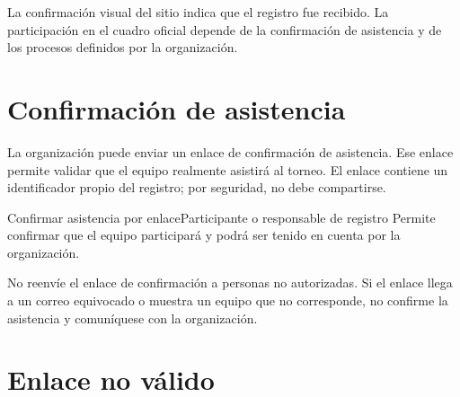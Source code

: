 \begin{nota}
La confirmación visual del sitio indica que el registro fue recibido. La participación en el cuadro oficial depende de la confirmación de asistencia y de los procesos definidos por la organización.
\end{nota}

\section{Confirmación de asistencia}

La organización puede enviar un enlace de confirmación de asistencia. Ese enlace permite validar que el equipo realmente asistirá al torneo. El enlace contiene un identificador propio del registro; por seguridad, no debe compartirse.

\begin{procedimiento}{Confirmar asistencia por enlace}{Participante o responsable de registro}
Permite confirmar que el equipo participará y podrá ser tenido en cuenta por la organización.
\end{procedimiento}




\begin{advertencia}
No reenvíe el enlace de confirmación a personas no autorizadas. Si el enlace llega a un correo equivocado o muestra un equipo que no corresponde, no confirme la asistencia y comuníquese con la organización.
\end{advertencia}

\section{Enlace no válido}

